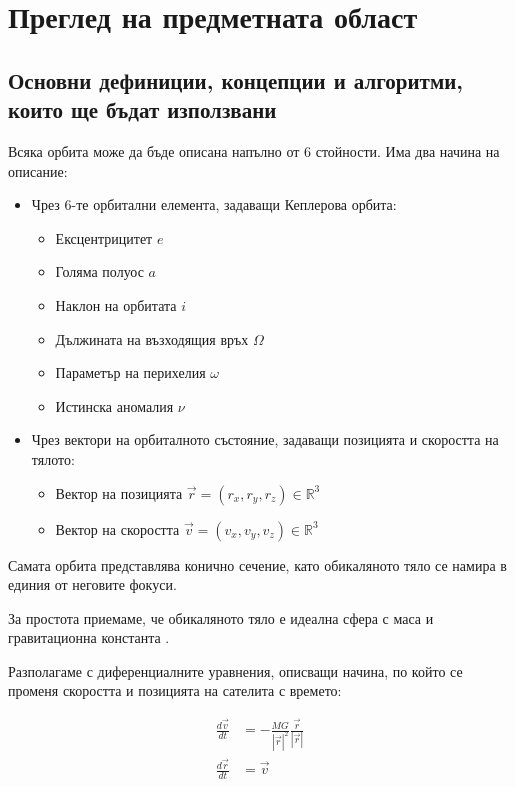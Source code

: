 \graphicspath{ {./chapter2/images/} }

\chapter{Преглед на предметната област}


\section{Основни дефиниции, концепции и алгоритми, които ще бъдат използвани}

Всяка орбита може да бъде описана напълно от 6 стойности. Има два начина на описание:

\begin{itemize}
	\item Чрез 6-те орбитални елемента, задаващи Кеплерова орбита:
	\begin{itemize}
		\item Ексцентрицитет \( e \)
		\item Голяма полуос \( a \)
		\item Наклон на орбитата \( i \) 
		\item Дължината на възходящия връх \( \Omega \)
		\item Параметър на перихелия \( \omega \)
		\item Истинска аномалия \( \nu \)
	\end{itemize}
	\item Чрез вектори на орбиталното състояние, задаващи позицията и скоростта на тялото:
	\begin{itemize}
		\item Вектор на позицията \( \vec{r} = \left( r_x, r_y, r_z \right) \in \mathbb{R}^3 \)
		\item Вектор на скоростта \( \vec{v} = \left( v_x, v_y, v_z \right) \in \mathbb{R}^3 \)
	\end{itemize}
\end{itemize}

Самата орбита представлява конично сечение, като обикаляното тяло се намира в единия от неговите фокуси.

За простота приемаме, че обикаляното тяло е идеална сфера с маса  и гравитационна константа .

Разполагаме с диференциалните уравнения, описващи начина, по който се променя скоростта и позицията на сателита с времето:

\begin{align*}
	\frac{d\vec{v}}{dt} &= -\frac{MG}{|\vec{r}|^2}\frac{\vec{r}}{|\vec{r}|} \\
	\frac{d\vec{r}}{dt} &= \vec{v}
\end{align*}

